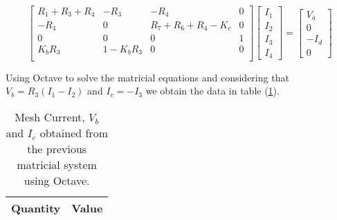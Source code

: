 \begin{equation}
  \begin{bmatrix}
    R_1+R_3+R_4 & -R_3 & -R_4 & 0\\
    -R_4 & 0 & R_7+R_6+R_4-K_c & 0\\
    0 & 0 & 0 & 1\\
    K_b R_3 & 1-K_b R_3 & 0 & 0\\
  \end{bmatrix}
  \begin{bmatrix}
    I_1 \\
    I_2 \\
    I_3 \\
    I_4
  \end{bmatrix}
  =
  \begin{bmatrix}
    V_a \\
    0 \\
    -I_d \\
    0
  \end{bmatrix}
\end{equation}

Using Octave to solve the matricial equations and considering that $V_b = R_3(I_1 - I_2)$ 
and $I_c = - I_3$ we obtain the data in table (\ref{tab:MeshMethod}).

\begin{table}[hbt!]
  \centering
  \begin{tabular}{|l|r|}
    \hline    
    {\bf Quantity} & {\bf Value} \\ \hline
    
  \end{tabular}
  \caption{Mesh Current, $V_b$ and $I_c$ obtained from the previous matricial system using Octave.}
  \label{tab:MeshMethod}
\end{table}